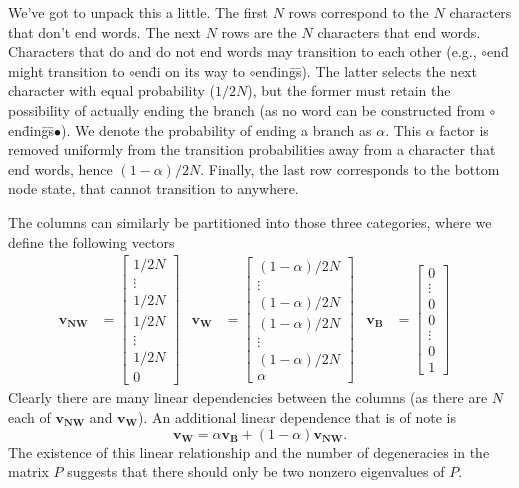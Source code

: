 \documentclass[11pt]{article}
\begin{document}
We've got to unpack this a little. The first $N$ rows correspond to the $N$ characters that don't end words. The next $N$ rows are the $N$ characters that end words. Characters that do and do not end words may transition to each other (e.g., $\circ$en\=d might transition to $\circ$en\=di on its way to $\circ$en\=din\=g\=s). The latter selects the next character with equal probability ($1/2N$), but the former must retain the possibility of actually ending the branch (as no word can be constructed from $\circ$en\=din\=g\=s$\bullet$). We denote the probability of ending a branch as $\alpha$. This $\alpha$ factor is removed uniformly from the transition probabilities away from a character that end words, hence $(1-\alpha)/2N$. Finally, the last row corresponds to the bottom node state, that cannot transition to anywhere.

The columns can similarly be partitioned into those three categories, where we define the following vectors
\begin{align}
\mathbf{v_{NW}}& = \left[\begin{array}{c}
 1/2N \\ \vdots \\ 1/2N \\ 1/2N \\ \vdots \\ 1/2N \\ 0
\end{array}\right] & 
\mathbf{v_W}& = \left[\begin{array}{c}
(1-\alpha)/2N \\ \vdots \\ (1-\alpha)/2N \\ (1-\alpha)/2N \\ \vdots \\ (1-\alpha)/2N \\ \alpha
\end{array}\right] & 
\mathbf{v_B}& = \left[\begin{array}{c}
0 \\ \vdots \\ 0 \\ 0 \\ \vdots \\ 0 \\ 1
\end{array}\right] & 
\end{align}
Clearly there are many linear dependencies between the columns (as there are $N$ each of $\mathbf{v_{NW}}$ and $\mathbf{v_W}$). An additional linear dependence that is of note is
\begin{equation}
\mathbf{v_W} = \alpha\mathbf{v_B} + (1-\alpha)\mathbf{v_{NW}}.
\end{equation}
The existence of this linear relationship and the number of degeneracies in the matrix $P$ suggests that there should only be two nonzero eigenvalues of $P$.
\end{document}
